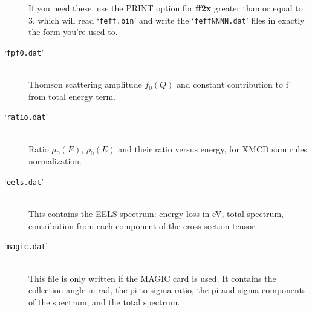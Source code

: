 \documentclass[11pt,oneside]{report} %
\renewcommand{\htmlref}[2]{\hyperlink{#2}{#1}}
\newcommand{\file}[1]{`\texttt{#1}'}
\newcommand{\module}[1]{\textrm{\bf{#1}}}
\renewcommand{\htmlref}[2]{{#1}} %
\begin{document}
\begin{latexonly}
\begin{description}
  If you need these, use the \htmlref{PRINT}{card:pri} option for \module{ff2x}
  greater than or equal to 3, which will read \file{feff.bin} and write the
  \file{feffNNNN.dat} files in exactly the form you're used to.
\item[\file{fpf0.dat}] \hfill\\ Thomson scattering amplitude $f_0(Q)$
  and constant contribution to f' from total energy term.
\item[\file{ratio.dat}] \hfill\\ Ratio $\mu_0(E)$, $ \rho_0(E)$ and
  their ratio versus energy, for XMCD sum rules normalization.
\item[\file{eels.dat}]\hfill\\ This contains the EELS spectrum: energy loss in 
  eV, total spectrum, contribution from each component of the cross section tensor.
\item[\file{magic.dat}]\hfill\\ This file is only written if the 
\htmlref{MAGIC}{card:mag} card is used. It contains the collection 
angle in rad, the pi to sigma ratio, the pi and sigma components 
of the spectrum, and the total spectrum. 
\end{description}



\end{latexonly}
\end{document}
